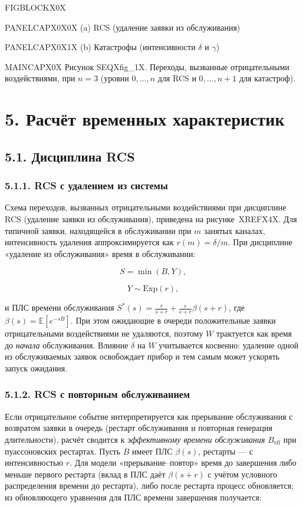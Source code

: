 \noindent FIGBLOCKX0X\par

\noindent PANELCAPX0X0X (a) RCS (удаление заявки из обслуживания)\par

\noindent PANELCAPX0X1X (b) Катастрофы (интенсивности \(\delta\) и \(\gamma\))\par

\noindent MAINCAPX0X Рисунок SEQXfig_1X. Переходы, вызванные отрицательными воздействиями, при \(n=3\) (уровни \(0,\dots,n\) для RCS и \(0,\dots,n+1\) для катастроф).\par




\section*{5. Расчёт временных характеристик}
\subsection*{5.1. Дисциплина RCS}
\subsubsection*{5.1.1. RCS с удалением из системы}
Схема переходов, вызванных отрицательными воздействиями при дисциплине RCS (удаление заявки из обслуживания), приведена на рисунке~XREFX4X.
Для типичной заявки, находящейся в обслуживании при \(m\) занятых каналах, интенсивность удаления аппроксимируется как \(r(m)=\delta/m\). При дисциплине «удаление из обслуживания» время в обслуживании:


\[S=\min(B,Y),\]

\[Y\sim\mathrm{Exp}(r),\]


и ПЛС времени обслуживания \(S^*(s)=\frac{r}{s+r}+\frac{s}{s+r}\beta(s+r)\), где \(\beta(s)=\mathbb{E}[e^{-sB}]\). При этом ожидающие в очереди положительные заявки отрицательными воздействиями не удаляются, поэтому \(W\) трактуется как время до \emph{начала} обслуживания. Влияние \(\delta\) на \(W\) учитывается косвенно: удаление одной из обслуживаемых заявок освобождает прибор и тем самым может ускорять запуск ожидания.

\subsubsection*{5.1.2. RCS с повторным обслуживанием}
Если отрицательное событие интерпретируется как прерывание обслуживания с возвратом заявки в очередь (рестарт обслуживания и повторная генерация длительности), расчёт сводится к \emph{эффективному времени обслуживания} \(B_{\mathrm{eff}}\) при пуассоновских рестартах. Пусть \(B\) имеет ПЛС \(\beta(s)\), рестарты --- с интенсивностью \(r\). Для модели «прерывание--повтор» время до завершения либо меньше первого рестарта (вклад в ПЛС даёт \(\beta(s+r)\) с учётом условного распределения времени до рестарта), либо после рестарта процесс обновляется; из обновляющего уравнения для ПЛС времени завершения получается:


